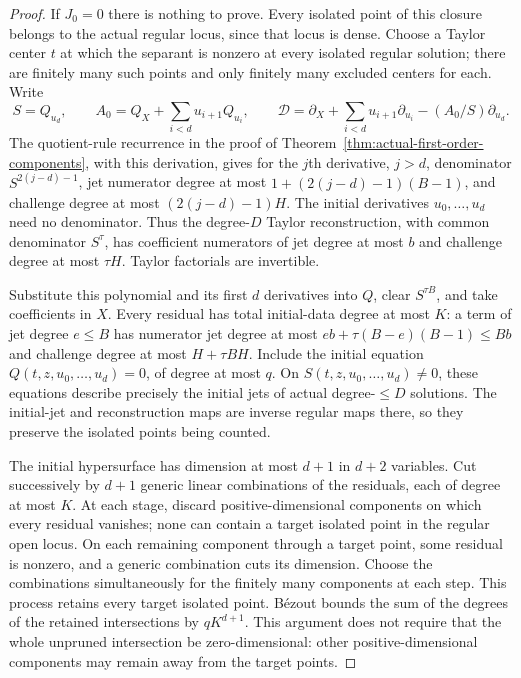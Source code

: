 \begin{proof}
If $J_0=0$ there is nothing to prove. Every isolated point of this
closure belongs to the actual regular locus, since that locus is dense.
Choose a Taylor center $t$ at which the separant is nonzero at every
isolated regular solution; there are finitely many such points and
only finitely many excluded centers for each. Write
\[
 S=Q_{u_d},\qquad A_0=Q_X+\sum_{i<d}u_{i+1}Q_{u_i},\qquad
 \mathcal D=\partial_X+\sum_{i<d}u_{i+1}\partial_{u_i}
                    -(A_0/S)\partial_{u_d}.
\]
The quotient-rule recurrence in the proof of
Theorem~\ref{thm:actual-first-order-components}, with this derivation,
gives for the $j$th derivative, $j>d$, denominator
$S^{2(j-d)-1}$, jet numerator degree at most
$1+(2(j-d)-1)(B-1)$, and challenge degree at most $(2(j-d)-1)H$.
The initial derivatives $u_0,\ldots,u_d$ need no denominator.
Thus the degree-$D$ Taylor reconstruction, with common denominator
$S^\tau$, has coefficient numerators of jet degree at most $b$ and
challenge degree at most $\tau H$. Taylor factorials are invertible.

Substitute this polynomial and its first $d$ derivatives into $Q$,
clear $S^{\tau B}$, and take coefficients in $X$. Every residual has
total initial-data degree at most $K$: a term of jet degree $e\le B$
has numerator jet degree at most
$eb+\tau(B-e)(B-1)\le Bb$ and challenge degree at most
$H+\tau BH$. Include the initial equation
$Q(t,z,u_0,\ldots,u_d)=0$, of degree at most $q$.
On $S(t,z,u_0,\ldots,u_d)\ne0$, these equations describe precisely
the initial jets of actual degree-$\le D$ solutions. The initial-jet
and reconstruction maps are inverse regular maps there, so they
preserve the isolated points being counted.

The initial hypersurface has dimension at most $d+1$ in $d+2$
variables. Cut successively by $d+1$ generic linear combinations of
the residuals, each of degree at most $K$. At each stage, discard
positive-dimensional components on which every residual vanishes;
none can contain a target isolated point in the regular open locus.
On each remaining component through a target point, some residual
is nonzero, and a generic combination cuts its dimension. Choose the
combinations simultaneously for the finitely many components at
each step. This process retains every target isolated point.
B\'ezout bounds the sum of the degrees of the retained intersections
by $qK^{d+1}$. This argument does not require that the whole unpruned
intersection be zero-dimensional: other positive-dimensional
components may remain away from the target points.
\end{proof}

